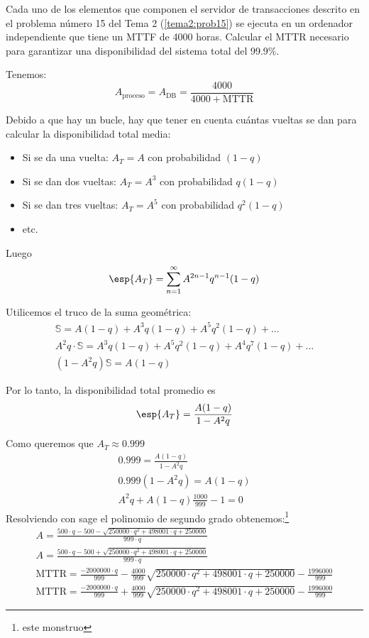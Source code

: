\newpage
\begin{problem}[8]
Cada uno de los elementos que componen el servidor de transacciones descrito en el problema número 15 del Tema 2 (\ref{tema2:prob15}) se ejecuta en un ordenador independiente que tiene un MTTF de 4000 horas. Calcular el MTTR necesario para garantizar una disponibilidad del sistema total del 99.9\%.

\solution

Tenemos:
\[ A_{\text{proceso}} = A_{\text{DB}} = \frac{4000}{4000+\text{MTTR}}\]

Debido a que hay un bucle, hay que tener en cuenta cuántas vueltas se dan para calcular la disponibilidad total media:
\begin{itemize}
	\item Si se da una vuelta: $A_T = A$ con probabilidad $(1-q)$
	\item Si se dan dos vueltas: $A_T = A^3$ con probabilidad $q(1-q)$
	\item Si se dan tres vueltas: $A_T = A^5$ con probabilidad $q^2(1-q)$
	\item etc.
\end{itemize}

Luego
\[ \esp{A_T} = \sum\limits_{n=1}^{\infty} A^{2n-1} q^{n-1}(1-q) \]

Utilicemos el truco de la suma geométrica:
\begin{gather*}
\mathbb{S} = A(1 - q) + A^{3} q(1-q) + A^{5} q^{2}(1-q) + ...\\
A^{2} q \cdot \mathbb{S} = A^{3} q(1-q) + A^{5} q^{2}(1-q) + A^{4} q^{7}(1-q) + ...\\
(1 - A^{2} q)\mathbb{S} = A(1 - q)
\end{gather*}

Por lo tanto, la disponibilidad total promedio es
\[ \esp{A_T} = \frac{A(1 - q)}{1 - A^{2} q} \]

Como queremos que $A_T \approx 0.999$
\begin{gather*}
0.999 = \frac{A(1 - q)}{1 - A^{2} q}\\
0.999 (1 - A^{2} q) = A(1 - q)\\
A^{2} q + A (1 - q) \frac{1000}{999} - 1 = 0
\end{gather*}
Resolviendo con sage el polinomio de segundo grado obtenemos:\footnote{este monstruo}
\begin{gather*}
A = \frac{500 \cdot q - 500 - \sqrt{250000 \cdot q^2 + 498001 \cdot q + 250000}}{999 \cdot q}\\
A = \frac{500 \cdot q - 500 + \sqrt{250000 \cdot q^2 + 498001 \cdot q + 250000}}{999 \cdot q}\\
\text{MTTR} = \frac{-2000000 \cdot q}{999} - \frac{4000}{999} \sqrt{250000 \cdot q^2 + 498001 \cdot q + 250000} - \frac{1996000}{999}\\
\text{MTTR} = \frac{-2000000 \cdot q}{999} + \frac{4000}{999} \sqrt{250000 \cdot q^2 + 498001 \cdot q + 250000} - \frac{1996000}{999}
\end{gather*}


\end{problem}

